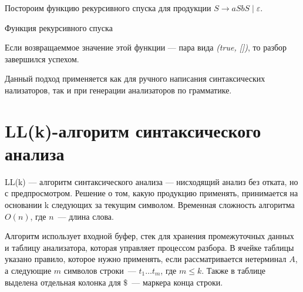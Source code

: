 \begin{example}

Постороим функцию рекурсивного спуска для продукции $S \rightarrow aSbS \mid \varepsilon$.

\begin{algorithm}
\begin{algorithmic}[1]
\caption{Функция рекурсивного спуска}
    \EndIf

         \Else
        \EndIf
    \Else
    \EndIf
\EndFunction

\end{algorithmic}
\end{algorithm}
\end{example}

Если возвращаеммое значение этой функции  --- пара вида \textit{(true, [])}, то разбор завершился успехом.

Данный подход применяется как для ручного написания синтаксических нализаторов, так и при генерации анализаторов по грамматике.

\section{LL(k)-алгоритм синтаксического анализа}

LL(k) --- алгоритм синтаксического анализа --- нисходящий анализ без отката, но с предпросмотром.
Решение о том, какую продукцию применять, принимается на основании k следующих за текущим символом.
Временная сложность алгоритма $O(n)$, где $n$~--- длина слова.

Алгоритм использует входной буфер, стек для хранения промежуточных данных и таблицу анализатора, которая управляет процессом разбора.
В ячейке таблицы указано правило, которое нужно применять, если рассматривается нетерминал $A$, а следующие $m$ символов строки~--- $t_{1} \dots t_{m}$, где $m \leq k$.
Также в таблице выделена отдельная колонка для $\$$~--- маркера конца строки.

